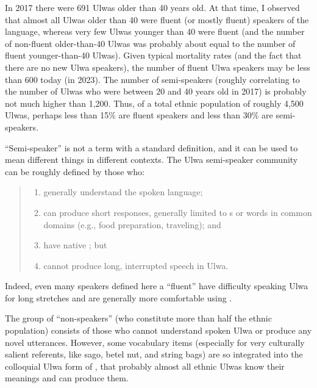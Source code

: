 {In 2017} there were 691 Ulwas older than 40 years old. At that time, I observed that almost all Ulwas older than 40 were fluent (or mostly fluent) speakers of the language, whereas very few Ulwas younger than 40 were fluent (and the number of non-fluent older-than-40 Ulwas was probably about equal to the number of fluent younger-than-40 Ulwas). Given typical mortality rates (and the fact that there are no new Ulwa speakers), the number of fluent Ulwa speakers may be less than 600 today (in 2023). The number of semi-speakers (roughly correlating to the number of Ulwas who were between 20 and 40 years old in 2017) is probably not much higher than 1,200. Thus, of a total ethnic population of roughly 4,500 Ulwas, perhaps less than 15\% are fluent speakers and less than 30\% are semi-speakers.

\newpage

“Semi-speaker” is not a term with a standard definition, and it can be used to mean different things in different contexts. The Ulwa semi-speaker community can be roughly defined by those who:
  
\begin{quote}
\begin{enumerate}[noitemsep, label={(\roman*)}, align=left, widest=190, labelsep=1ex,leftmargin=*]
\item generally understand the spoken language;
\item can produce short responses, generally limited to s or words in common  domains (e.g., food preparation, traveling); and
\item have native ; but
\item cannot produce long, interrupted speech in Ulwa.
  \end{enumerate}
  \end{quote}
  
Indeed, even many speakers defined here a “fluent” have difficulty speaking Ulwa for long stretches and are generally more comfortable using .



The group of “non-speakers” (who constitute more than half the ethnic population) consists of those who cannot understand spoken Ulwa or produce any novel utterances. However, some vocabulary items (especially for very culturally salient referents, like sago, betel nut, and string bags) are so integrated into the colloquial Ulwa form of , that probably almost all ethnic Ulwas know their meanings and can produce them.

